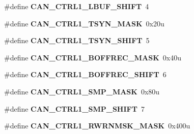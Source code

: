 \begin{DoxyCompactItemize}
\item 
\#define {\bfseries C\+A\+N\+\_\+\+C\+T\+R\+L1\+\_\+\+L\+B\+U\+F\+\_\+\+S\+H\+I\+FT}~4\hypertarget{group__CAN__Register__Masks_ga1ebb72a42560e1f78bb6f10cfeec8945}{}\label{group__CAN__Register__Masks_ga1ebb72a42560e1f78bb6f10cfeec8945}

\item 
\#define {\bfseries C\+A\+N\+\_\+\+C\+T\+R\+L1\+\_\+\+T\+S\+Y\+N\+\_\+\+M\+A\+SK}~0x20u\hypertarget{group__CAN__Register__Masks_ga2ceb4b7bca561020b4899dd2087e5260}{}\label{group__CAN__Register__Masks_ga2ceb4b7bca561020b4899dd2087e5260}

\item 
\#define {\bfseries C\+A\+N\+\_\+\+C\+T\+R\+L1\+\_\+\+T\+S\+Y\+N\+\_\+\+S\+H\+I\+FT}~5\hypertarget{group__CAN__Register__Masks_gaff5bfe8a985c0511b72d2518b0bb1708}{}\label{group__CAN__Register__Masks_gaff5bfe8a985c0511b72d2518b0bb1708}

\item 
\#define {\bfseries C\+A\+N\+\_\+\+C\+T\+R\+L1\+\_\+\+B\+O\+F\+F\+R\+E\+C\+\_\+\+M\+A\+SK}~0x40u\hypertarget{group__CAN__Register__Masks_ga830ac693c34ebcc732acb2649afd87b2}{}\label{group__CAN__Register__Masks_ga830ac693c34ebcc732acb2649afd87b2}

\item 
\#define {\bfseries C\+A\+N\+\_\+\+C\+T\+R\+L1\+\_\+\+B\+O\+F\+F\+R\+E\+C\+\_\+\+S\+H\+I\+FT}~6\hypertarget{group__CAN__Register__Masks_ga0c22289dc934d1dcc577a77f1c7130a4}{}\label{group__CAN__Register__Masks_ga0c22289dc934d1dcc577a77f1c7130a4}

\item 
\#define {\bfseries C\+A\+N\+\_\+\+C\+T\+R\+L1\+\_\+\+S\+M\+P\+\_\+\+M\+A\+SK}~0x80u\hypertarget{group__CAN__Register__Masks_ga3f5256ab5fbe54468bce422ba7ee4fbf}{}\label{group__CAN__Register__Masks_ga3f5256ab5fbe54468bce422ba7ee4fbf}

\item 
\#define {\bfseries C\+A\+N\+\_\+\+C\+T\+R\+L1\+\_\+\+S\+M\+P\+\_\+\+S\+H\+I\+FT}~7\hypertarget{group__CAN__Register__Masks_ga51311c5bddb44be7525e317cde09d9b4}{}\label{group__CAN__Register__Masks_ga51311c5bddb44be7525e317cde09d9b4}

\item 
\#define {\bfseries C\+A\+N\+\_\+\+C\+T\+R\+L1\+\_\+\+R\+W\+R\+N\+M\+S\+K\+\_\+\+M\+A\+SK}~0x400u\hypertarget{group__CAN__Register__Masks_ga5f1140aae7ce80eb8ee0793c3171f841}{}\label{group__CAN__Register__Masks_ga5f1140aae7ce80eb8ee0793c3171f841}


\end{DoxyCompactItemize}

